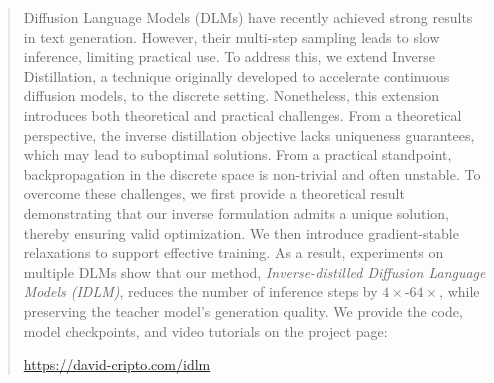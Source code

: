 \begin{abstract}
    Diffusion Language Models (DLMs) have recently achieved strong results in text generation. However, their multi-step sampling leads to slow inference, limiting practical use. To address this, we extend Inverse Distillation, a technique originally developed to accelerate continuous diffusion models, to the discrete setting.
    Nonetheless, this extension introduces both theoretical and practical challenges. From a theoretical perspective, the inverse distillation objective lacks uniqueness guarantees, which may lead to suboptimal solutions. From a practical standpoint, backpropagation in the discrete space is non-trivial and often unstable. To overcome these challenges, we first provide a theoretical result demonstrating that our inverse formulation admits a unique solution, thereby ensuring valid optimization. We then introduce gradient-stable relaxations to support effective training. 
    As a result, experiments on multiple DLMs show that our method, \textit{Inverse-distilled Diffusion Language Models (IDLM)}, reduces the number of inference steps by $4 \times$-$64 \times$, while preserving the teacher model’s generation quality.  We provide the code, model checkpoints, and video tutorials on the project page: 

    \vspace{0.3ex}
    \centerline{\href{https://david-cripto.github.io/idlm-project-page/}{https://david-cripto.com/idlm}}
    \vspace{-5mm}
\end{abstract}
